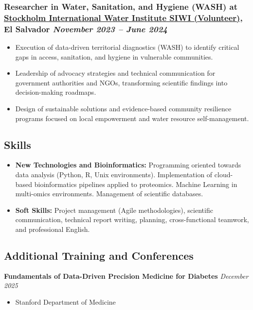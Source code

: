 \documentclass[a4paper,10pt]{article}
\begin{document}
\subsubsection*{%
  \textbf{Researcher in Water, Sanitation, and Hygiene (WASH)} at \href{https://www.linkedin.com/company/stockholm-international-water-institute/posts/?feedView=all}{Stockholm International Water Institute SIWI (Volunteer)}, El Salvador
  \hfill
  \textit{November 2023 -- June 2024}
}
\begin{itemize}
  \item Execution of data-driven territorial diagnostics (WASH) to identify critical gaps in access, sanitation, and hygiene in vulnerable communities.
  \item Leadership of advocacy strategies and technical communication for government authorities and NGOs, transforming scientific findings into decision-making roadmaps.
  \item Design of sustainable solutions and evidence-based community resilience programs focused on local empowerment and water resource self-management.
\end{itemize}

\subsection*{Skills}
\begin{itemize}
  \item \textbf{New Technologies and Bioinformatics:} Programming oriented towards data analysis (Python, R, Unix environments). Implementation of cloud-based bioinformatics pipelines applied to proteomics. Machine Learning in multi-omics environments. Management of scientific databases.
  \item \textbf{Soft Skills:} Project management (Agile methodologies), scientific communication, technical report writing, planning, cross-functional teamwork, and professional English.
\end{itemize}

\subsection*{Additional Training and Conferences}

\textbf{Fundamentals of Data-Driven Precision Medicine for Diabetes} \hfill \textit{December 2025}
\begin{itemize}
    \item Stanford Department of Medicine
\end{itemize}
\end{document}
